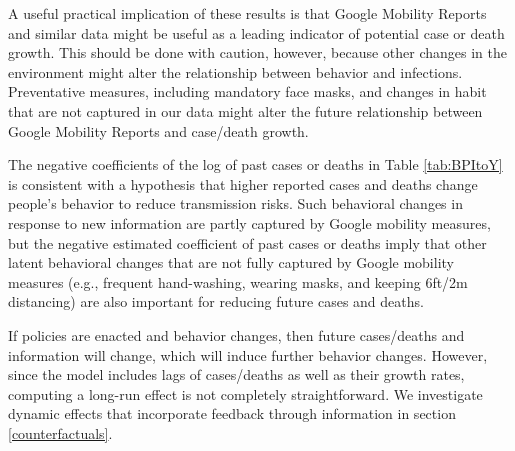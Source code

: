 \documentclass[3p, longtitle]{elsarticle}
\theoremstyle{definition}
\renewcommand{\to}{{\rightarrow}}
\begin{document}
A useful practical implication of these results is that Google Mobility Reports and similar data might be useful as a leading indicator of potential case or death growth. This should be done with caution, however, because other changes in the environment might alter the relationship between behavior and infections. Preventative measures, including mandatory face masks, and changes in habit that are not captured in our data might alter the future relationship between Google Mobility Reports and case/death growth.

The negative coefficients of the log of past cases or deaths in
Table \ref{tab:BPItoY} is
consistent with a hypothesis that higher reported cases and deaths change people's behavior to reduce transmission risks. Such behavioral changes in response to new information   are  partly captured by Google mobility measures, but the negative estimated coefficient of past cases or deaths imply that other latent behavioral changes that are not fully captured by Google mobility measures (e.g., frequent hand-washing, wearing masks, and keeping 6ft/2m distancing) are also important for reducing future cases and deaths.

If policies are enacted and behavior changes, then future cases/deaths and information will change, which will induce further behavior changes.  However, since the model includes lags of cases/deaths as well as their growth rates,  computing a long-run effect is not completely straightforward. We investigate dynamic effects that incorporate feedback through information in section \ref{counterfactuals}.


%       
\end{document}
